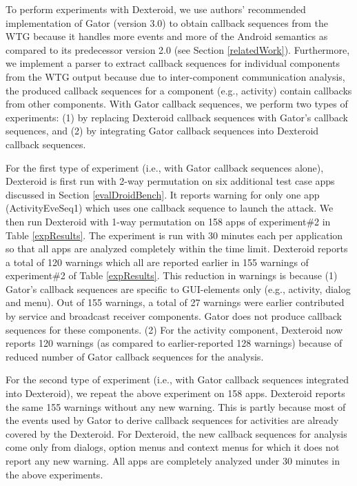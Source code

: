 \documentclass[10pt]{elsarticle}
\begin{document}
To perform experiments with Dexteroid, we use authors' \cite{ARountev} recommended implementation of Gator (version 3.0) to obtain callback sequences from the WTG because it handles more events and more of the Android semantics as compared to its predecessor version 2.0 \cite{GatorICSE} (see Section \ref{relatedWork}). Furthermore, we implement a parser to extract callback sequences for individual components from the WTG output because due to inter-component communication analysis, the produced callback sequences for a component (e.g., activity) contain callbacks from other components. With Gator callback sequences, we perform two types of experiments: (1) by replacing Dexteroid callback sequences with Gator's callback sequences, and (2) by integrating Gator callback sequences into Dexteroid callback sequences.

For the first type of experiment (i.e., with Gator callback sequences alone), Dexteroid is first run with 2-way permutation on six additional test case apps discussed in Section \ref{evalDroidBench}. It reports warning for only one app (ActivityEveSeq1) which uses one callback sequence to launch the attack. We then run Dexteroid with 1-way permutation on 158 apps of experiment\#2 in Table \ref{expResults}. The experiment is run with 30 minutes each per application so that all apps are analyzed completely within the time limit. Dexteroid reports a total of 120 warnings which all are reported earlier in 155 warnings of experiment\#2 of Table \ref{expResults}. This reduction in warnings is because (1) Gator's callback sequences are specific to GUI-elements only (e.g., activity, dialog and menu). Out of 155 warnings, a total of 27 warnings were earlier contributed by service and broadcast receiver components. Gator does not produce callback sequences for these components. (2) For the activity component, Dexteroid now reports 120 warnings (as compared to earlier-reported 128 warnings) because of reduced number of Gator callback sequences for the analysis.
	
For the second type of experiment (i.e., with Gator callback sequences integrated into Dexteroid), we repeat the above experiment on 158 apps. Dexteroid reports the same 155 warnings without any new warning. This is partly because most of the events used by Gator to derive callback sequences for activities are already covered by the Dexteroid. For Dexteroid, the new callback sequences for analysis come only from dialogs, option menus and context menus for which it does not report any new warning. All apps are completely analyzed under 30 minutes in the above experiments.
	  
\end{document}
